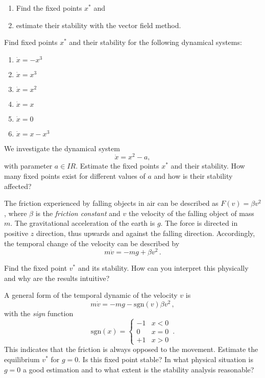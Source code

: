   \begin{enumerate}
      \item Find the fixed points $x^*$ and 
      \item estimate their stability with the vector field method.
  \end{enumerate}

  \subexercise
  
  Find fixed points $x^*$  and their stability for the following dynamical systems:
  \begin{enumerate}
      \item $\dot x = - x^3$
      \item $\dot x = x^3$
      \item $\dot x =x^2$
      \item $\dot x = x$
      \item $\dot x = 0$
      \item $\dot x = x-x^3$
  \end{enumerate}
  
  \subexercise[topic=Bifurcation]
  
  
  We investigate the dynamical system
  \begin{equation}
      \dot x = x^2 - a,
  \end{equation}
  with parameter $a\in I\!\!R$.
  Estimate the fixed points $x^*$ and their stability. How many fixed points exist for different values of $a$ and how is their stability affected?

  \subexercise[topic=Newton Friction]
  
  
  The friction experienced by falling objects in air can be described as
  $F(v) = \beta v^2$, where $\beta$ is the \emph{friction constant} and
  $v$ the velocity of the falling object of mass $m$. The gravitational
  acceleration of the earth is $g$. The force is directed in positive $z$ direction, thus upwards and against the falling direction. Accordingly, the temporal change of the velocity can be described by 
    \begin{equation}
      m\dot v = -mg+\beta v^2\,.
  \end{equation}
 
 Find the fixed point $v^*$ and its stability. How can you interpret this physically and why are the results intuitive? 
  
  
  A general form of the temporal dynamic of the velocity $v$ is 
  \begin{equation}
      m\dot v = -mg-\mathrm{sgn}(v)\beta v^2\,,
  \end{equation}
with the \emph{sign} function
  \begin{equation}
      \mathrm{sgn}(x)=\begin{cases}-1 & x<0\\
          0 & x=0\\
          +1 & x>0\end{cases}\,.
  \end{equation}
  This indicates that the friction is always opposed to the movement.
  Estimate the equilibrium  $v^*$ for $g=0$. Is this fixed point
  stable? In what physical situation is $g=0$ a good estimation and to what extent is the stability analysis reasonable?
  
